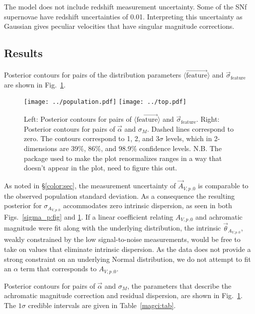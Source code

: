 \documentclass{aastex61}   	%
\begin{document}
The model does not include redshift measurement uncertainty.  Some of the SNf supernovae have redshift uncertainties of 0.01.  Interpreting
this uncertainty as Gaussian gives peculiar velocities that have singular magnitude corrections.

\subsection{Results}
\label{achromaticresults:sec}
Posterior contours for pairs of the distribution parameters
$\langle \overrightarrow{\text{feature}}\rangle$ and
$\vec{\sigma}_{\text{feature}}$ are shown in Fig.~\ref{confidence:fig}. 

\begin{figure}[htbp] %
   \centering
   \texttt{[image: ../population.pdf]}
   \texttt{[image: ../top.pdf]}
   \caption{Left: 
Posterior contours for pairs of
$\langle \overrightarrow{\text{feature}}\rangle$ and
$\vec{\sigma}_{\text{feature}}$.  Right: Posterior contours for pairs of $\vec{\alpha}$ and
$\sigma_M$.  Dashed lines correspond to zero.
The contours correspond to  1, 2, and  3$\sigma$ levels, which in 2-dimensions are
39\%,  86\%, and 98.9\%   confidence levels.
N.B. The package used to make the plot renormalizes ranges in a way that doesn't appear in the plot, need
to figure  this out.
   \label{confidence:fig}}
\end{figure}

As noted in
\S\ref{color:sec}, the measurement uncertainty of ${\vec{A}_{V,p\,.0}}$ is comparable to the observed
population standard deviation.  As a  consequence
the resulting
posterior for  $\sigma_{{A_{V,p\,.0}}}$  accommodates zero intrinsic dispersion, as
seen in both Figs.~\ref{sigma_p:fig} and \ref{confidence:fig}.  If 
a linear coefficient relating ${A_{V,p\,.0}}$
and achromatic magnitude were  fit along with the underlying distribution, the intrinsic  $\vec{\theta}_{A_{V,p\,.0}}$, weakly constrained by the 
low signal-to-noise measurements, would be
free to take on values that eliminate intrinsic dispersion.  As the data does not provide a strong constraint on an underlying Normal distribution,
we do not attempt to fit an $\alpha$ term that corresponds to  ${A_{V,p\,.0}}$.


Posterior contours for pairs  of $\vec{\alpha}$ and
$\sigma_M$, the parameters that describe the achromatic magnitude correction and residual dispersion, are shown in Fig.~\ref{confidence:fig}.
The $1\sigma$ credible intervals are given in Table~\ref{magci:tab}.
\end{document}
